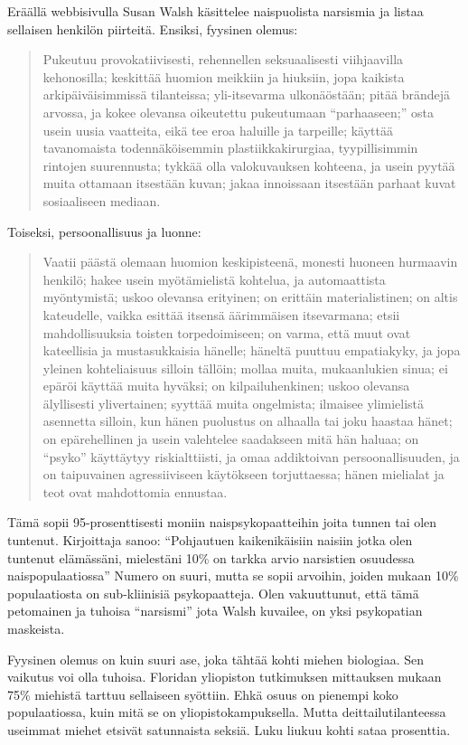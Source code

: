 Eräällä webbisivulla Susan Walsh käsittelee naispuolista narsismia ja listaa sellaisen henkilön piirteitä. Ensiksi, fyysinen olemus:
\begin{quotation}
\noindent Pukeutuu provokatiivisesti, rehennellen seksuaalisesti viihjaavilla kehonosilla; keskittää huomion meikkiin ja hiuksiin, jopa kaikista arkipäiväisimmissä tilanteissa; yli-itsevarma ulkonäöstään; pitää brändejä arvossa, ja kokee olevansa oikeutettu pukeutumaan ``parhaaseen;'' osta usein uusia vaatteita, eikä tee eroa haluille ja tarpeille; käyttää tavanomaista todennäköisemmin plastiikkakirurgiaa, tyypillisimmin rintojen suurennusta; tykkää olla valokuvauksen kohteena, ja usein pyytää muita ottamaan itsestään kuvan; jakaa innoissaan itsestään parhaat kuvat sosiaaliseen mediaan.
\end{quotation}
Toiseksi, persoonallisuus ja luonne:
\begin{quotation}
\noindent Vaatii päästä olemaan huomion keskipisteenä, monesti huoneen hurmaavin henkilö; hakee usein myötämielistä kohtelua, ja automaattista myöntymistä; uskoo olevansa erityinen; on erittäin materialistinen; on altis kateudelle, vaikka esittää itsensä äärimmäisen itsevarmana; etsii mahdollisuuksia toisten torpedoimiseen; on varma, että muut ovat kateellisia ja mustasukkaisia hänelle; häneltä puuttuu empatiakyky, ja jopa yleinen kohteliaisuus silloin tällöin; mollaa muita, mukaanlukien sinua; ei epäröi käyttää muita hyväksi; on kilpailuhenkinen; uskoo olevansa älyllisesti ylivertainen; syyttää muita ongelmista; ilmaisee ylimielistä asennetta silloin, kun hänen puolustus on alhaalla tai joku haastaa hänet; on epärehellinen ja usein valehtelee saadakseen mitä hän haluaa; on ``psyko\vmq{,}'' käyttäytyy riskialttiisti, ja omaa addiktoivan persoonallisuuden, ja on taipuvainen agressiiviseen käytökseen torjuttaessa; hänen mielialat ja teot ovat mahdottomia ennustaa.
\end{quotation}
Tämä sopii 95-prosenttisesti moniin naispsykopaatteihin joita tunnen tai olen tuntenut. Kirjoittaja sanoo: ``Pohjautuen kaikenikäisiin naisiin jotka olen tuntenut elämässäni, mielestäni 10\% on tarkka arvio narsistien osuudessa naispopulaatiossa'' Numero on suuri, mutta se sopii arvoihin, joiden mukaan 10\% populaatiosta on sub-kliinisiä psykopaatteja. Olen vakuuttunut, että tämä petomainen ja tuhoisa ``narsismi\vmq{,}'' jota Walsh kuvailee, on yksi psykopatian maskeista.

Fyysinen olemus on kuin suuri ase, joka tähtää kohti miehen biologiaa. Sen vaikutus voi olla tuhoisa. Floridan yliopiston tutkimuksen mittauksen mukaan 75\% miehistä tarttuu sellaiseen syöttiin. Ehkä osuus on pienempi koko populaatiossa, kuin mitä se on yliopistokampuksella. Mutta deittailutilanteessa useimmat miehet etsivät satunnaista seksiä. Luku liukuu kohti sataa prosenttia.

